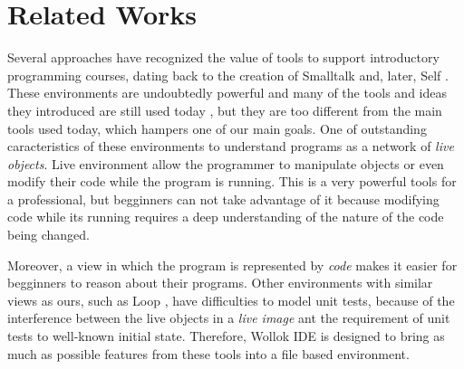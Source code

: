 \section{Related Works}
\label{sec:related}


Several approaches have recognized the value of tools to support introductory programming courses,
dating back to the creation of Smalltalk \cite{Gold84a} and, later, Self \cite{Unga87a}.
These environments are undoubtedly powerful 
and many of the tools and ideas they introduced are still used today  
\cite{ingalls_back_1997,ducasse2006squeak},
but they are too different from the main tools used today,
which hampers one of our main goals.
One of outstanding caracteristics of these environments to understand programs as a network of \emph{live objects}.
Live environment allow the programmer to manipulate objects or even modify their code 
while the program is running. 
This is a very powerful tools for a professional, 
but begginners can not take advantage of it 
because modifying code while its running requires 
a deep understanding of the nature of the code being changed.

Moreover, a view in which the program is represented by \emph{code} 
makes it easier for begginners to reason about their programs.
Other environments with similar views as ours, such as Loop \cite{griggio_programming_2011}, 
have difficulties to model unit tests, 
because of the interference between the live objects in a \emph{live image}
ant the requirement of unit tests to well-known initial state.
Therefore, Wollok IDE is designed to bring as much as possible features from these tools into a 
file based environment.


